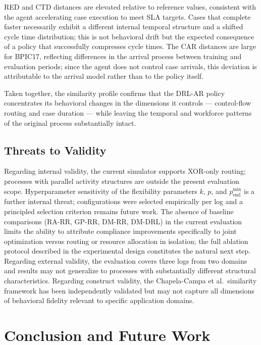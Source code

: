 \documentclass[runningheads]{llncs}
\begin{document}
RED and CTD distances are elevated relative to reference values, 
consistent with the agent accelerating case execution to meet 
SLA targets. Cases that complete faster necessarily exhibit 
a different internal temporal structure and a shifted cycle 
time distribution; this is not behavioral drift but the 
expected consequence of a policy that successfully compresses 
cycle times. The CAR distances are large for BPIC17, reflecting 
differences in the arrival process between training and 
evaluation periods; since the agent does not control case 
arrivals, this deviation is attributable to the arrival model 
rather than to the policy itself.

Taken together, the similarity profile confirms that the 
DRL-AR policy concentrates its behavioral changes in the 
dimensions it controls --- control-flow routing and case 
duration --- while leaving the temporal and workforce 
patterns of the original process substantially intact.

\subsection{Threats to Validity}
\label{subsec:threats}

Regarding internal validity, the current simulator supports 
XOR-only routing; processes with parallel activity structures 
are outside the present evaluation scope. Hyperparameter 
sensitivity of the flexibility parameters $k$, $p$, and 
$p_{\mathrm{end}}^{\min}$ is a further internal threat; 
configurations were selected empirically per log and a 
principled selection criterion remains future work. The absence 
of baseline comparisons (RA-RR, GP-RR, DM-RR, DM-DRL) in the 
current evaluation limits the ability to attribute compliance 
improvements specifically to joint optimization versus routing 
or resource allocation in isolation; the full ablation 
protocol described in the experimental design constitutes 
the natural next step. Regarding external validity, the 
evaluation covers three logs from two domains and results 
may not generalize to processes with substantially different 
structural characteristics. Regarding construct validity, 
the Chapela-Campa et al.\ similarity framework has been 
independently validated but may not capture all dimensions 
of behavioral fidelity relevant to specific application domains.

\section{Conclusion and Future Work}
\label{sec:conclusion}
\end{document}
